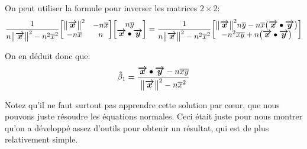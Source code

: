 \documentclass[a4paper]{article}
\begin{document}
{    On peut utiliser la formule pour inverser les matrices $2 \times 2$:
    \[\frac{1}{n \left\|\bvec{x}\right\|^2 - n^2 \bar{x}^2} \begin{bmatrix} \left\|\bvec{x}\right\|^2 & -n \bar{x} \\ -n \bar{x} & n \end{bmatrix} \begin{bmatrix} n \bar{y} \\ \bvec{x} \dotprod \bvec{y} \end{bmatrix} = \frac{1}{n \left\|\bvec{x}\right\|^2 - n^2 \bar{x}^2} \begin{bmatrix} \left\|\bvec{x}\right\|^2 n \bar{y} - n \bar{x} \left(\bvec{x} \dotprod \bvec{y}\right) \\ -n^2 \bar{x} \bar{y} + n\left(\bvec{x} \dotprod \bvec{y}\right)  \end{bmatrix}\]

    On en déduit donc que: 
    \[\hat{\beta}_1 = \frac{\bvec{x} \dotprod \bvec{y} - n \bar{x} \bar{y}}{\left\|\bvec{x}\right\|^2 - n \bar{x}^2}\]
    
    Notez qu'il ne faut surtout pas apprendre cette solution par cœur, que nous pouvons juste résoudre les équations normales. Ceci était juste pour nous montrer qu'on a développé assez d'outils pour obtenir un résultat, qui est de plus relativement simple.
}

\end{document}

